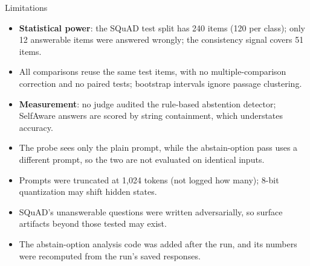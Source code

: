\documentclass[aspectratio=169,11pt,usepdftitle=false]{beamer}
\begin{document}
\begin{frame}{Limitations}
\footnotesize
\begin{itemize}
\item \textbf{Statistical power}: the SQuAD test split has 240 items (120 per class); only 12 answerable items were answered wrongly; the consistency signal covers 51 items.
\item All comparisons reuse the same test items, with no multiple-comparison correction and no paired tests; bootstrap intervals ignore passage clustering.
\item \textbf{Measurement}: no judge audited the rule-based abstention detector; SelfAware answers are scored by string containment, which understates accuracy.
\item The probe sees only the plain prompt, while the abstain-option pass uses a different prompt, so the two are not evaluated on identical inputs.
\item Prompts were truncated at 1,024 tokens (not logged how many); 8-bit quantization may shift hidden states.
\item SQuAD's unanswerable questions were written adversarially, so surface artifacts beyond those tested may exist.
\item The abstain-option analysis code was added after the run, and its numbers were recomputed from the run's saved responses.
\end{itemize}
\end{frame}
\end{document}
